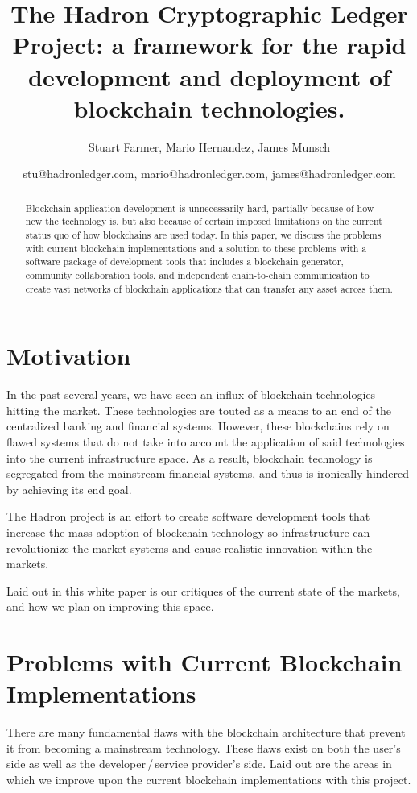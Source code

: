 \documentclass{%
	article}
\title{The Hadron Cryptographic Ledger Project: a framework for the rapid development and deployment of blockchain technologies.}
\author{Stuart Farmer, Mario Hernandez, James Munsch}
\date{stu@hadronledger.com, mario@hadronledger.com, james@hadronledger.com}
\begin{document}
\sloppy

\begin{titlingpage}
    \maketitle
    \begin{abstract}
        Blockchain application development is unnecessarily hard, partially because of how new the technology is, but also because of certain imposed limitations on the current status quo of how blockchains are used today. In this paper, we discuss the problems with current blockchain implementations and a solution to these problems with a software package of development tools that includes a blockchain generator, community collaboration tools, and independent chain-to-chain communication to create vast networks of blockchain applications that can transfer any asset across them.
    \end{abstract}
\end{titlingpage}

\section{Motivation}

In the past several years, we have seen an influx of blockchain technologies hitting the market. These technologies are touted as a means to an end of the centralized banking and financial systems. However, these blockchains rely on flawed systems that do not take into account the application of said technologies into the current infrastructure space. As a result, blockchain technology is segregated from the mainstream financial systems, and thus is ironically hindered by achieving its end goal.

The Hadron project is an effort to create software development tools that increase the mass adoption of blockchain technology so infrastructure can revolutionize the market systems and cause realistic innovation within the markets.

Laid out in this white paper is our critiques of the current state of the markets, and how we plan on improving this space.

\section{Problems with Current Blockchain\\ Implementations}

There are many fundamental flaws with the blockchain architecture that prevent it from becoming a mainstream technology. These flaws exist on both the user’s side as well as the developer\,/\,service provider’s side. Laid out are the areas in which we improve upon the current blockchain implementations with this project.
\end{document}
